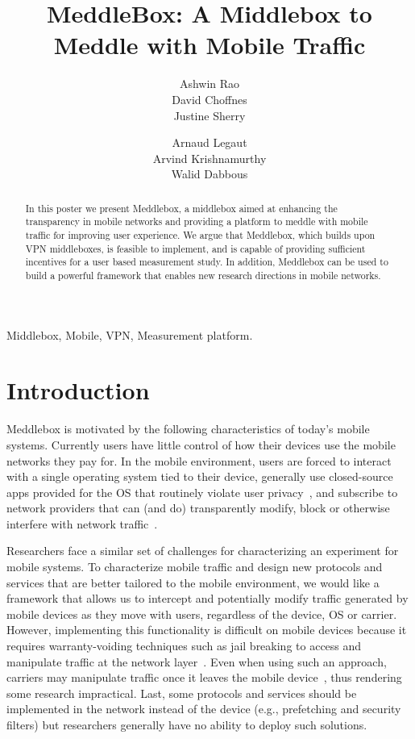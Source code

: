 \documentclass{sig-alternate-10pt}
\title{MeddleBox: A Middlebox to Meddle with Mobile Traffic}
\author{
\alignauthor
Ashwin Rao\\
\affaddr{INRIA}
\alignauthor        
David Choffnes\\
\affaddr{University of Washington}
\alignauthor
Justine Sherry\\
\affaddr{UC Berkeley}
\and
\alignauthor
Arnaud Legaut\\
\affaddr{INRIA}
\alignauthor 
Arvind Krishnamurthy\\
\affaddr{University of Washington}
\alignauthor
Walid Dabbous\\
\affaddr{INRIA}
}
\date{}
\newcommand{\meddlebox}{{Meddlebox}\xspace}
\begin{document}
	
\maketitle

\begin{abstract}
In this poster we present \meddlebox, a middlebox aimed at enhancing
the transparency in mobile networks and providing a platform to
meddle with mobile traffic for improving user experience. We argue
that \meddlebox, which builds upon VPN middleboxes, is feasible to
implement, and is capable of providing sufficient incentives for a
user based measurement study. In addition, \meddlebox can be used to
build a powerful framework that enables new research directions in
mobile networks.
\end{abstract}

\begin{keywords}
Middlebox, Mobile, VPN, Measurement platform.
\end{keywords}

\section{Introduction}

\meddlebox is motivated by the following characteristics of today's
mobile systems. Currently users have little control of how their
devices use the mobile networks they pay for. In the mobile
environment, users are forced to interact with a single operating
system tied to their device, generally use closed-source apps provided
for the OS that routinely violate user
privacy~\cite{hornyack:appfence}, and subscribe to network providers
that can (and do) transparently modify, block or otherwise interfere
with network traffic~\cite{wang:middleboxes}.

Researchers face a similar set of challenges for characterizing an
experiment for mobile systems. To characterize mobile traffic and
design new protocols and services that are better tailored to the
mobile environment, we would like a framework that allows us to
intercept and potentially modify traffic generated by mobile devices
as they move with users, regardless of the device, OS or
carrier. However, implementing this functionality is difficult on
mobile devices because it requires warranty-voiding techniques such as
jail breaking to access and manipulate traffic at the network
layer~\cite{enck:taintdroid}. Even when using such an approach,
carriers may manipulate traffic once it leaves the mobile
device~\cite{wang:middleboxes}, thus rendering some research
impractical. Last, some protocols and services should be implemented
in the network instead of the device (e.g., prefetching and security
filters) but researchers generally have no ability to deploy such
solutions.
\end{document}
